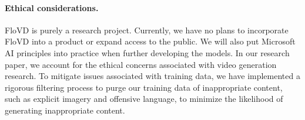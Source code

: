 \vspace{-3.5mm}
\paragraph{Ethical considerations.}
FloVD is purely a research project. Currently, we have no plans to incorporate FloVD into a product or expand access to the public. We will also put Microsoft AI principles into practice when further developing the models. In our research paper, we account for the ethical concerns associated with video generation research. To mitigate issues associated with training data, we have implemented a rigorous filtering process to purge our training data of inappropriate content, such as explicit imagery and offensive language, to minimize the likelihood of generating inappropriate content. 

